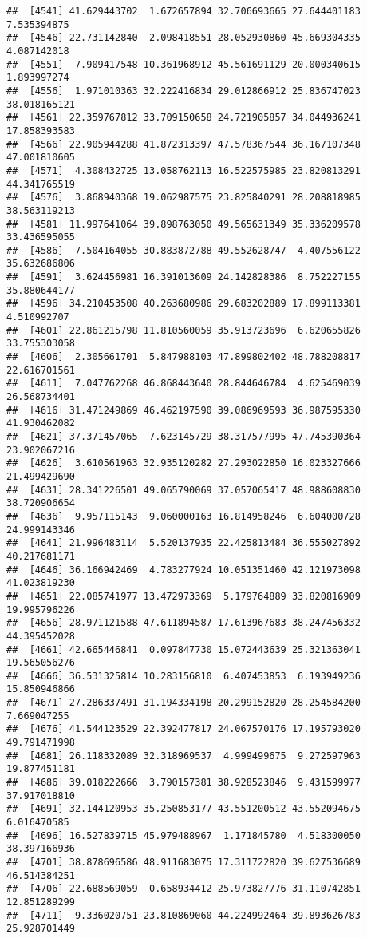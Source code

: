 \documentclass[
]{article}
\begin{document}
\begin{verbatim}
##  [4541] 41.629443702  1.672657894 32.706693665 27.644401183  7.535394875
##  [4546] 22.731142840  2.098418551 28.052930860 45.669304335  4.087142018
##  [4551]  7.909417548 10.361968912 45.561691129 20.000340615  1.893997274
##  [4556]  1.971010363 32.222416834 29.012866912 25.836747023 38.018165121
##  [4561] 22.359767812 33.709150658 24.721905857 34.044936241 17.858393583
##  [4566] 22.905944288 41.872313397 47.578367544 36.167107348 47.001810605
##  [4571]  4.308432725 13.058762113 16.522575985 23.820813291 44.341765519
##  [4576]  3.868940368 19.062987575 23.825840291 28.208818985 38.563119213
##  [4581] 11.997641064 39.898763050 49.565631349 35.336209578 33.436595055
##  [4586]  7.504164055 30.883872788 49.552628747  4.407556122 35.632686806
##  [4591]  3.624456981 16.391013609 24.142828386  8.752227155 35.880644177
##  [4596] 34.210453508 40.263680986 29.683202889 17.899113381  4.510992707
##  [4601] 22.861215798 11.810560059 35.913723696  6.620655826 33.755303058
##  [4606]  2.305661701  5.847988103 47.899802402 48.788208817 22.616701561
##  [4611]  7.047762268 46.868443640 28.844646784  4.625469039 26.568734401
##  [4616] 31.471249869 46.462197590 39.086969593 36.987595330 41.930462082
##  [4621] 37.371457065  7.623145729 38.317577995 47.745390364 23.902067216
##  [4626]  3.610561963 32.935120282 27.293022850 16.023327666 21.499429690
##  [4631] 28.341226501 49.065790069 37.057065417 48.988608830 38.720906654
##  [4636]  9.957115143  9.060000163 16.814958246  6.604000728 24.999143346
##  [4641] 21.996483114  5.520137935 22.425813484 36.555027892 40.217681171
##  [4646] 36.166942469  4.783277924 10.051351460 42.121973098 41.023819230
##  [4651] 22.085741977 13.472973369  5.179764889 33.820816909 19.995796226
##  [4656] 28.971121588 47.611894587 17.613967683 38.247456332 44.395452028
##  [4661] 42.665446841  0.097847730 15.072443639 25.321363041 19.565056276
##  [4666] 36.531325814 10.283156810  6.407453853  6.193949236 15.850946866
##  [4671] 27.286337491 31.194334198 20.299152820 28.254584200  7.669047255
##  [4676] 41.544123529 22.392477817 24.067570176 17.195793020 49.791471998
##  [4681] 26.118332089 32.318969537  4.999499675  9.272597963 19.877451181
##  [4686] 39.018222666  3.790157381 38.928523846  9.431599977 37.917018810
##  [4691] 32.144120953 35.250853177 43.551200512 43.552094675  6.016470585
##  [4696] 16.527839715 45.979488967  1.171845780  4.518300050 38.397166936
##  [4701] 38.878696586 48.911683075 17.311722820 39.627536689 46.514384251
##  [4706] 22.688569059  0.658934412 25.973827776 31.110742851 12.851289299
##  [4711]  9.336020751 23.810869060 44.224992464 39.893626783 25.928701449

\end{verbatim}
\end{document}
